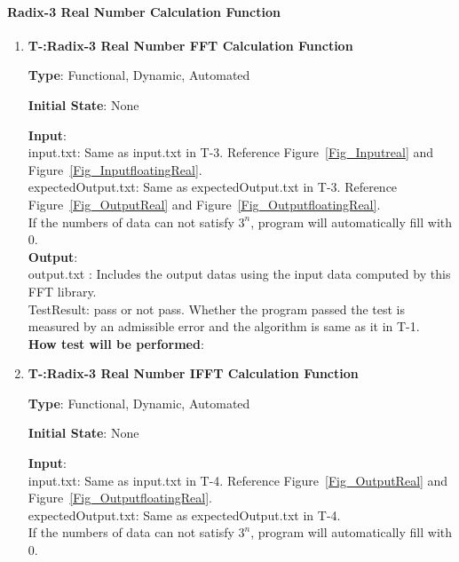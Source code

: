 \documentclass[12pt, titlepage]{article}
\newcounter{tnum}
\begin{document}
\paragraph{Radix-3 Real Number Calculation Function\\}

\begin{enumerate}

\item{\textbf{T-\thetnum \label{R3RFFT}:Radix-3 Real Number FFT Calculation Function}}

\textbf {Type}: Functional, Dynamic, Automated
					
\textbf {Initial State}: None
					
\textbf {Input}:\\
{\large input.txt}: Same as input.txt in T-3. Reference  Figure~\ref{Fig_Inputreal} and Figure~\ref{Fig_InputfloatingReal}. \\
{\large expectedOutput.txt}: Same as  expectedOutput.txt in T-3.  Reference  Figure~\ref{Fig_OutputReal} and Figure~\ref{Fig_OutputfloatingReal}.\\
If the numbers of data can not satisfy $3^n$, program will automatically fill with 0.\\
					
\textbf {Output}: \\{\large output.txt} : Includes the output datas using the input data computed by this FFT library.\\
{\large TestResult}: pass or not pass. Whether the program passed the test is measured by an admissible error and the algorithm is same as it in T-1.\\
					
\textbf {How test will be performed}: \\


\item{\textbf{T-\thetnum \label{R3RIFFT}:Radix-3 Real Number IFFT Calculation Function}}

\textbf {Type}: Functional, Dynamic, Automated
					
\textbf {Initial State}: None
					
\textbf {Input}:\\
{\large input.txt}: Same as input.txt in T-4. Reference   Figure~\ref{Fig_OutputReal} and Figure~\ref{Fig_OutputfloatingReal}.\\
{\large expectedOutput.txt}: Same as  expectedOutput.txt in T-4.\\
If the numbers of data can not satisfy $3^n$, program will automatically fill with 0.\\
					

\end{enumerate}
\end{document}
